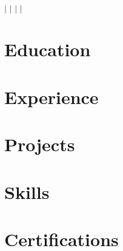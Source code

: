 \documentclass[letterpaper,10pt]{article}
\begin{document}
\begin{center}
  {\Huge\bfseries\scshape \cvName} \\ \vspace{3pt}
  \small \cvLocation $|$ \cvPhone $|$ \href{mailto:\cvEmail}{\cvEmail} $|$
  \href{\cvGithubUrl}{\cvGithub} $|$ \href{\cvPortfolioUrl}{\cvPortfolio}
\end{center}

\section{Education}      \cvEducation
\section{Experience}     \cvExperience
\section{Projects}       \cvProjects
\section{Skills}         \cvSkills
\section{Certifications} \cvCerts
\end{document}
